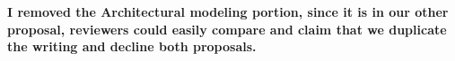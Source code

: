 \textbf{I removed the Architectural modeling portion, since it is in 
our other proposal, reviewers could easily compare and claim that we 
duplicate the writing and decline both proposals.}

